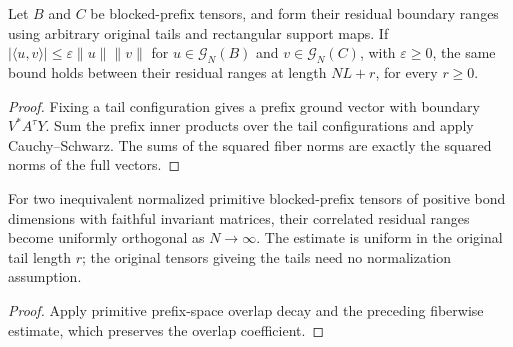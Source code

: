 \begin{lemma}
    \label{thm:correlated_residual_overlap}
    \leanok
    Let $B$ and $C$ be blocked-prefix tensors, and form their residual boundary
    ranges using arbitrary original tails and rectangular support maps. If
    $\lvert\langle u,v\rangle\rvert\leq\varepsilon\lVert u\rVert\lVert v\rVert$
    for $u\in\mathcal G_N(B)$ and $v\in\mathcal G_N(C)$, with $\varepsilon\geq0$,
    the same bound holds between their residual ranges at length $NL+r$,
    for every $r\geq0$.
\end{lemma}
\begin{proof}\leanok
    Fixing a tail configuration gives a prefix ground vector with boundary
    $V^*A^\tau Y$. Sum the prefix inner products over the tail configurations
    and apply Cauchy--Schwarz. The sums of the squared fiber norms are exactly
    the squared norms of the full vectors.
\end{proof}

\begin{lemma}
    \label{thm:residual_sector_overlap_decay}
    \leanok
    For two inequivalent normalized primitive blocked-prefix tensors of
    positive bond dimensions with faithful invariant matrices, their correlated residual ranges become
    uniformly orthogonal as $N\to\infty$. The estimate is uniform in the
    original tail length $r$; the original tensors giveing the tails need
    no normalization assumption.
\end{lemma}
\begin{proof}\leanok
    Apply primitive prefix-space overlap decay and the preceding fiberwise
    estimate, which preserves the overlap coefficient.
\end{proof}


